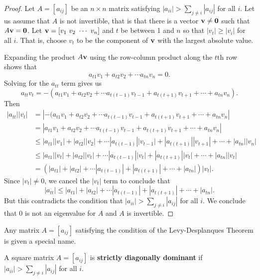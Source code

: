 \begin{proof} Let $A = [a_{ij}]$ be an $n \times n$ matrix satisfying $|a_{ii}| > \sum_{j \neq i} |a_{ij}|$ for all $i$. Let us assume that $A$ is not invertible, that is that there is a vector $\mathbf{v} \neq \mathbf{0}$ such that $A \mathbf{v} = \mathbf{0}$. Let $\mathbf{v} = [v_1 \ v_2 \ \cdots \ v_n]$ and $t$ be between 1 and $n$ so that $|v_t| \geq |v_i|$ for all $i$. That is, choose $v_t$ to be the component of $\mathbf{v}$ with the largest absolute value.

Expanding the product $A\mathbf{v}$ using the row-column product along the $t$th row shows that 
\[a_{t1}v_1 + a_{t2}v_2 + \cdots a_{tn}v_n = 0.\]
Solving for the $a_{tt}$ term gives us 
\[a_{tt}v_t = -(a_{t1}v_1 + a_{t2}v_2 + \cdots a_{t(t-1)}v_{t-1}+a_{t(t+1)}v_{t+1} + \cdots + a_{tn}v_n).\]
Then
\begin{align*}
|a_{tt}| |v_t| &= |-(a_{t1}v_1 + a_{t2}v_2 + \cdots a_{t(t-1)}v_{t-1}+a_{t(t+1)}v_{t+1} + \cdots + a_{tn}v_n| \\
	&= |a_{t1}v_1 + a_{t2}v_2 + \cdots a_{t(t-1)}v_{t-1}+a_{t(t+1)}v_{t+1} + \cdots + a_{tn}v_n| \\
	&\leq |a_{t1}| |v_1| + |a_{t2}| |v_2| + \cdots |a_{t(t-1)}| |v_{t-1}| + |a_{t(t+1)}| |v_{t+1}| + \cdots + |a_{tn}| |v_n| \\
	&\leq |a_{t1}| |v_t| + |a_{t2}| |v_t| + \cdots |a_{t(t-1)}| |v_{t}| + |a_{t(t+1)}| |v_{t}| + \cdots + |a_{tn}| |v_t| \\
	&=  (|a_{t1}| + |a_{t2}| + \cdots |a_{t(t-1)}|  + |a_{t(t+1)}| + \cdots + |a_{tn}|) |v_t|.
\end{align*}
Since $|v_t| \neq 0$, we cancel the $|v_t|$ term to conclude that 
\[|a_{tt}| \leq  |a_{t1}| + |a_{t2}| + \cdots |a_{t(t-1)}|  + |a_{t(t+1)}| + \cdots + |a_{tn}|.\]
But this contradicts the condition that $|a_{ii}| > \sum_{j \neq i} |a_{ij}|$ for all $i$. We conclude that 0 is not an eigenvalue for $A$ and $A$ is invertible.
\end{proof}

Any matrix $A = [a_{ij}]$ satisfying the condition of the Levy-Desplanques Theorem is given a special name.

\begin{definition} A square matrix $A = [a_{ij}]$ is \textbf{strictly diagonally dominant} if $|a_{ii}| > \sum_{j \neq i} |a_{ij}|$ for all $i$. 
\end{definition}

